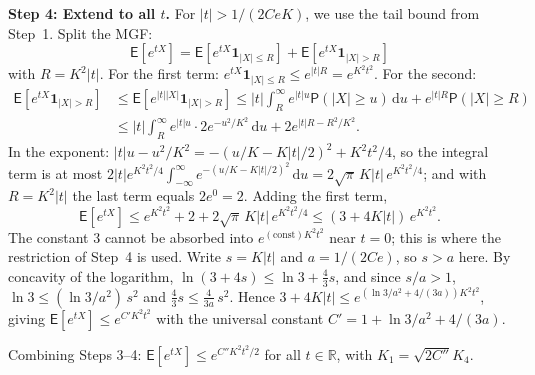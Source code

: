 \documentclass[12pt,a4paper]{article}
\makeatletter
\theoremstyle{definition}
\renewenvironment{proof}[1][\proofname]{\par
  \pushQED{\qed}%
  \normalfont \topsep6\p@\@plus6\p@\relax
  \trivlist
  \item[\hskip\labelsep\bfseries #1\@addpunct{.}]\ignorespaces
}{%
  \popQED\endtrivlist\@endpefalse
}
\newcommand\expc{\mathsf{E}}
\newcommand\prb{\mathsf{P}}
\newcommand{\Real}{\mathbb{R}}
\newcommand{\dd}{\mathrm{d}}
\makeatother
\begin{document}
\begin{proof}
\textbf{Step 4: Extend to all $t$.} For $|t| > 1/(2CeK)$, we use the tail bound from Step~1. Split the MGF:
\[
\expc[e^{tX}] = \expc[e^{tX}\mathbf{1}_{|X| \leqslant R}] + \expc[e^{tX}\mathbf{1}_{|X| > R}]
\]
with $R = K^2|t|$. For the first term: $e^{tX}\mathbf{1}_{|X| \leqslant R} \leqslant e^{|t|R} = e^{K^2t^2}$. For the second:
\begin{align*}
\expc[e^{tX}\mathbf{1}_{|X|>R}] &\leqslant \expc[e^{|t||X|}\mathbf{1}_{|X|>R}] \leqslant |t|\int_R^\infty e^{|t|u}\prb(|X| \geqslant u)\,\dd u + e^{|t|R}\prb(|X| \geqslant R)\\
&\leqslant |t|\int_R^\infty e^{|t|u}\cdot 2e^{-u^2/K^2}\,\dd u + 2e^{|t|R - R^2/K^2}.
\end{align*}
In the exponent: $|t|u - u^2/K^2 = -(u/K - K|t|/2)^2 + K^2t^2/4$, so the integral term is at most $2|t|e^{K^2t^2/4}\int_{-\infty}^\infty e^{-(u/K - K|t|/2)^2}\,\dd u = 2\sqrt{\pi}\,K|t|\,e^{K^2t^2/4}$; and with $R = K^2|t|$ the last term equals $2e^{0} = 2$. Adding the first term,
\[
\expc[e^{tX}] \leqslant e^{K^2t^2} + 2 + 2\sqrt{\pi}\,K|t|\,e^{K^2t^2/4} \leqslant (3 + 4K|t|)\,e^{K^2t^2}.
\]
The constant $3$ cannot be absorbed into $e^{(\text{const})K^2t^2}$ near $t = 0$; this is where the restriction of Step~4 is used. Write $s = K|t|$ and $a = 1/(2Ce)$, so $s > a$ here. By concavity of the logarithm, $\ln(3 + 4s) \leqslant \ln 3 + \tfrac{4}{3}s$, and since $s/a > 1$, $\ln 3 \leqslant (\ln 3/a^2)\,s^2$ and $\tfrac43 s \leqslant \tfrac{4}{3a}\,s^2$. Hence $3 + 4K|t| \leqslant e^{(\ln 3/a^2 + 4/(3a))K^2t^2}$, giving $\expc[e^{tX}] \leqslant e^{C'K^2t^2}$ with the universal constant $C' = 1 + \ln 3/a^2 + 4/(3a)$.

Combining Steps 3--4: $\expc[e^{tX}] \leqslant e^{C''K^2t^2/2}$ for all $t \in \Real$, with $K_1 = \sqrt{2C''}K_4$.
\end{proof}
\end{document}
